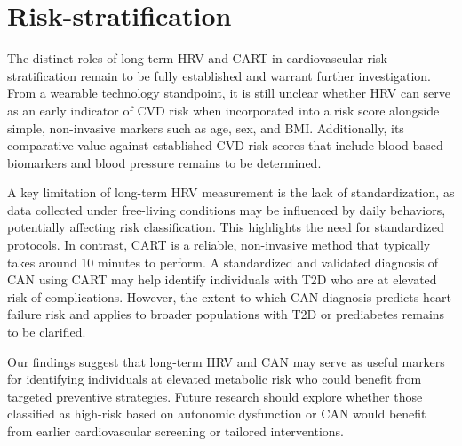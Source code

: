\documentclass[
  a4paper,
  headsepline=true,
  open=any]{scrbook}
\begin{document}
\hypertarget{risk-stratification-1}{%
\section{Risk-stratification}\label{risk-stratification-1}}

The distinct roles of long-term HRV and CART in cardiovascular risk
stratification remain to be fully established and warrant further
investigation. From a wearable technology standpoint, it is still
unclear whether HRV can serve as an early indicator of CVD risk when
incorporated into a risk score alongside simple, non-invasive markers
such as age, sex, and BMI. Additionally, its comparative value against
established CVD risk scores that include blood-based biomarkers and
blood pressure remains to be determined.

A key limitation of long-term HRV measurement is the lack of
standardization, as data collected under free-living conditions may be
influenced by daily behaviors, potentially affecting risk
classification. This highlights the need for standardized protocols. In
contrast, CART is a reliable, non-invasive method that typically takes
around 10 minutes to perform. A standardized and validated diagnosis of
CAN using CART may help identify individuals with T2D who are at
elevated risk of complications. However, the extent to which CAN
diagnosis predicts heart failure risk and applies to broader populations
with T2D or prediabetes remains to be clarified.

Our findings suggest that long-term HRV and CAN may serve as useful
markers for identifying individuals at elevated metabolic risk who could
benefit from targeted preventive strategies. Future research should
explore whether those classified as high-risk based on autonomic
dysfunction or CAN would benefit from earlier cardiovascular screening
or tailored interventions.
\end{document}
